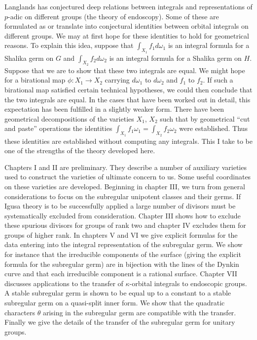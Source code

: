 \documentclass{memo-l}
\theoremstyle{definition}
\theoremstyle{remark}
\numberwithin{section}{chapter}
\numberwithin{equation}{chapter}
\begin{document}
Langlands has conjectured deep relations between integrals and
representations of $p$-adic on different groups (the theory of
endoscopy).  Some of these are formulated as or translate into
conjectural identities between orbital integrals on different groups.
We may at first hope for these identities to hold for geometrical
reasons.  To explain this idea, suppose that $\int_{X_1} f_1
d\omega_1$ is an integral formula for a Shalika germ on $G$ and
$\int_{X_2} f_2 d\omega_2$ is an integral formula for a Shalika germ
on $H$.  Suppose that we are to show that these two integrals are
equal.  We might hope for a birational map $\phi:X_1\to X_2$ carrying
$d\omega_1$ to $d\omega_2$ and $f_1$ to $f_2$.  If such a birational
map satisfied certain technical hypotheses, we could then conclude
that the two integrals are equal.  In the cases that have been worked
out in detail, this expectation has been fulfilled in a slightly
weaker form.  There have been geometrical decompositions of the
varieties $X_1$, $X_2$ such that by geometrical ``cut and paste''
operations the identities $\int_{X_1} f_1 \omega_1 = \int_{X_2} f_2
\omega_2$ were established.  Thus these identities are established
without computing any integrals.  This I take to be one of the
strengths of the theory developed here.


Chapters I and II are preliminary.  They describe a number of
auxiliary varieties used to construct the varieties of ultimate
concern to us.  Some useful coordinates on these varieties are
developed.  Beginning in chapter III, we turn from general
considerations to focus on the subregular unipotent classes and their
germs.  If Igusa theory is to be successfully applied a large number
of divisors must be systematically excluded from consideration.
Chapter III shows how to exclude these spurious divisors for groups of
rank two and chapter IV excludes them for groups of higher rank.  In
chapters V and VI we give explicit formulas for the data entering into
the integral representation of the subregular germ.  We show for
instance that the irreducible components of the surface (giving the
explicit formula for the subregular germ) are in bijection with the
lines of the Dynkin curve and that each irreducible component is a
rational surface.  Chapter VII discusses applications to the transfer
of $\kappa$-orbital integrals to endoscopic groups.  A stable
subregular germ is shown to be equal up to a constant to a stable
subregular germ on a quasi-split inner form.  We show that the
quadratic characters $\theta$ arising in the subregular germ are
compatible with the transfer.  Finally we give the details of the
transfer of the subregular germ for unitary groups.
\end{document}
